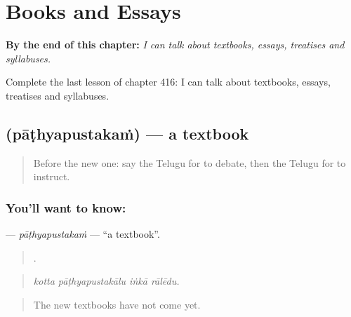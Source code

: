 
\chapter{Books and Essays}
\label{ch:te-books-and-essays}

\begin{chapteropening}
\textbf{By the end of this chapter:} \emph{I can talk about textbooks, essays, treatises and syllabuses.}

Complete the last lesson of chapter 416: I can talk about textbooks, essays, treatises and syllabuses.
\end{chapteropening}

\section[\texorpdfstring{\te{పాఠ్యపుస్తకం} (pāṭhyapustakaṁ)}{పాఠ్యపుస్తకం (pāṭhyapustakaṁ)}]{ (pāṭhyapustakaṁ) — a textbook}

\label{lesson:TE-C416-pathyapustakam}



\begin{quote}
Before the new one: say the Telugu for to debate, then the Telugu for to instruct.
\end{quote}

\subsection*{You'll want to know: }
\textbf{} — \emph{pāṭhyapustakaṁ} — \textquotedblleft{}a textbook\textquotedblright{}.

\begin{quote}
   .
\end{quote}

\begin{quote}
\emph{kotta pāṭhyapustakālu iṅkā rālēdu.}
\end{quote}

\begin{quote}
The new textbooks have not come yet.
\end{quote}

